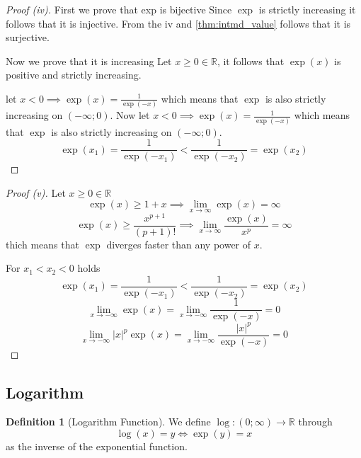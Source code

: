 \documentclass[english,titlepage]{uzhpub}
\theoremstyle{definition}
\newtheorem{definition}{Definition}[section]
\theoremstyle{plain}
\theoremstyle{remark}
\theoremstyle{example}
\begin{document}
   \begin{proof}[Proof (iv)]
      First we prove that exp is bijective
      Since \(\exp\) is strictly increasing it follows that it is injective.
      From the iv and \cref{thm:intmd_value} follows that it is surjective.

      Now we prove that it is increasing
      Let \(x \geq 0 \in \mathbb{R}\), it follows that \(\exp(x)\) is positive and strictly increasing.

 let \(x < 0 \implies \exp(x) = \frac{1}{\exp(-x)}\) which means that \(\exp\) is also strictly increasing on \((-\infty;0)\).
      Now let \(x < 0 \implies \exp(x) = \frac{1}{\exp(-x)}\) which means that \(\exp\) is also strictly increasing on \((-\infty;0)\).
      \[\exp(x_1) = \frac{1}{\exp(-x_1)} < \frac{1}{\exp(-x_2)} = \exp(x_2)\]
   \end{proof}

   \begin{proof}[Proof (v)]
      Let \(x \geq 0 \in \mathbb{R}\)
      \[\exp(x) \geq 1 + x \implies \lim_{x \to \infty} \exp(x) = \infty\]
      \[\exp(x) \geq \frac{x^{p+1}}{(p+1)!} \implies \lim_{x \to \infty} \frac{\exp(x)}{x^p} = \infty\]
      thich means that \(\exp\) diverges faster than any power of \(x\).

      For \(x_1 < x_2 < 0\) holds
      \[\exp(x_1) = \frac{1}{\exp(-x_1)} < \frac{1}{\exp(-x_2)} = \exp(x_2)\]
      \[\lim_{x \to -\infty} \exp(x) = \lim_{x \to -\infty} \frac{1}{\exp(-x)} = 0\]
      \[\lim_{x \to -\infty} |x|^p \exp(x) = \lim_{x \to -\infty} \frac{|x|^p}{\exp(-x)} = 0\]
   \end{proof}

   \subsection{Logarithm}
   \begin{definition}[Logarithm Function]
      We define \(\log: (0; \infty) \to \mathbb{R}\) through
      \[\log(x) = y \iff \exp(y) = x\]
      as the inverse of the exponential function.
   \end{definition}
\end{document}
